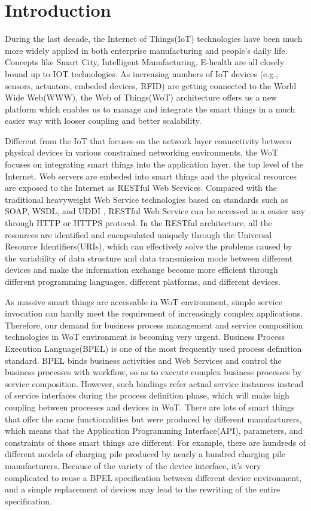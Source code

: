 \section{Introduction}
\label{Introduction}
During the last decade, the Internet of Things(IoT) technologies have been much more widely applied in both enterprise manufacturing and people's daily life. Concepts like Smart City, Intelligent Manufacturing, E-health are all closely bound up to IOT technologies. As increasing numbers of IoT devices (e.g., sensors, actuators, embeded devices, RFID) are getting connected to the World Wide Web(WWW)\cite{guinard2011internet}, the Web of Things(WoT) architecture offers us a new platform which enables us to manage and integrate the smart things in a much easier way with looser coupling and better scalability. 

Different from the IoT that focuses on the network layer connectivity between physical devices in various constrained networking environments, the WoT focuses on integrating smart things into the application layer, the top level of the Internet. Web servers are embeded into smart things and the physical resources are exposed to the Internet as RESTful Web Services\cite{guinard2010resource}. Compared with the traditional heavyweight Web Service technologies based on standards such as SOAP, WSDL, and UDDI , RESTful Web Service can be accessed in a easier way through HTTP or HTTPS protocol. In the RESTful architecture, all the resources are identified and  encapsulated uniquely through the Universal Resource Identifiers(URIs), which can effectively solve the problems caused by the variability of data structure and data transmission mode between different devices and make the information exchange become more efficient through different programming languages, different platforms, and different devices\cite{pautasso2008restful}.  

As massive smart things are accessable in WoT environment, simple service invocation can hardly meet the requirement of increasingly complex applications. Therefore, our demand for business process management and service composition technologies in WoT environment is becoming very urgent. Business Process Execution Language(BPEL) is one of the most frequently used process definition standard\cite{jordan2003web}. BPEL binds business activities and Web Services and control the business processes with workflow, so as to execute complex business processes by service composition. However, such bindings refer actual service instances instead of service  interfaces during the process definition phase, which will make high coupling between processes and devices in WoT. There are lots of smart things that offer the same functionalities but were produced by different manufacturers, which means that the Application Programming Interface(API), parameters, and constraints of those smart things are different. For example, there are hundreds of different models of charging pile produced by nearly a hundred charging pile manufacturers. Because of the variety of the device interface, it’s very complicated to reuse a BPEL specification between different device environment, and a simple replacement of devices may lead to the rewriting of the entire specification. 

